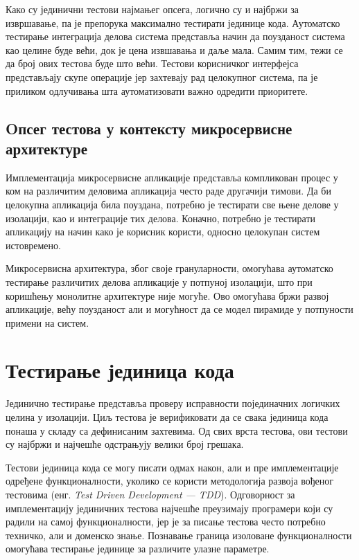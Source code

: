 \documentclass[12pt,oneside]{memoir}
\begin{document}
Како су јединични тестови најмањег опсега, логично су и најбржи за извршавање, па је препорука максимално тестирати јединице кода. Аутоматско тестирање интеграција делова система представља начин да поузданост система као целине буде већи, док је цена извшавања и даље мала. Самим тим, тежи се да број ових тестова буде што већи. Тестови корисничког интерфејса представљају скупе операције јер захтевају рад целокупног система, па је приликом одлучивања шта аутоматизовати важно одредити приоритете.

\subsection{Oпсег тестова у контексту микросервисне архитектуре}

Имплементација микросервисне апликације представља компликован процес у ком на различитим деловима апликација често раде другачији тимови. Да би целокупна апликација била поуздана, потребно је тестирати све њене делове у изолацији, као и интеграције тих делова. Коначно, потребно је тестирати апликацију на начин како је корисник користи, односно целокупан систем истовремено.

Микросервисна архитектура, због своје грануларности, омогућава аутоматско тестирање различитих делова апликације у потпуној изолацији, што при коришћењу монолитне архитектуре није могуће. Ово омогућава бржи развој апликације, већу поузданост али и могућност да се модел пирамиде у потпуности примени на систем. 

\section{Тестирање јединица кода}

Јединично тестирање представља проверу исправности појединачних логичких целина у изолацији. Циљ тестова је верификовати да се свака јединица кода понаша у складу са дефинисаним захтевима. Од свих врста тестова, ови тестови су најбржи и најчешће одстрањују велики број грешака. 

Тестови јединица кода се могу писати одмах након, али и пре имплементације одређене функционалности, уколико се користи методологија развоја вођеног тестовима (енг. \textit{Test Driven Development --- TDD}). Одговорност за имплементацију јединичних тестова најчешће преузимају програмери који су радили на самој функционалности, јер је за писање тестова често потребно техничко, али и доменско знање. Познавање граница изоловане функционалности омогућава тестирање  јединице за различите улазне параметре.
\end{document}
